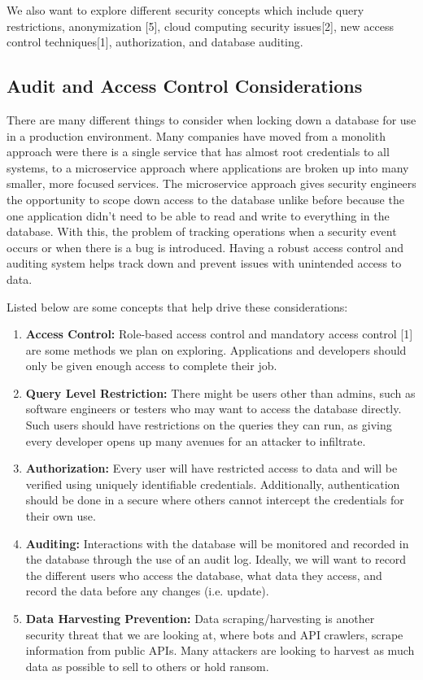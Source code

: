 \documentclass[sigconf]{acmart}
\begin{document}
We also want to explore different security concepts which include query restrictions, anonymization [5], cloud computing security issues[2], new access control techniques[1], authorization, and database auditing. 

\subsection{Audit and Access Control Considerations}

There are many different things to consider when locking down a database for use in a production environment. Many companies have moved from a monolith approach were there is a single service that has almost root credentials to all systems, to a microservice approach where applications are broken up into many smaller, more focused services. The microservice approach gives security engineers the opportunity to scope down access to the database unlike before because the one application didn't need to be able to read and write to everything in the database. With this, the problem of tracking operations when a security event occurs or when there is a bug is introduced. Having a robust access control and auditing system helps track down and prevent issues with unintended access to data.

Listed below are some concepts that help drive these considerations:
\begin{enumerate}
    \item \textbf{Access Control:} Role-based access control and mandatory access control [1] are some methods we plan on exploring. Applications and developers should only be given enough access to complete their job.
    
    \item \textbf{Query Level Restriction:} There might be users other than admins, such as software engineers or testers who may want to access the database directly. Such users should have restrictions on the queries they can run, as giving every developer opens up many avenues for an attacker to infiltrate.
    
    \item \textbf{Authorization:} Every user will have restricted access to data and will be verified using uniquely identifiable credentials. Additionally, authentication should be done in a secure where others cannot intercept the credentials for their own use.

    \item \textbf{Auditing:} Interactions with the database will be monitored and recorded in the database through the use of an audit log. Ideally, we will want to record the different users who access the database, what data they access, and record the data before any changes (i.e. update). 

   \item \textbf{Data Harvesting Prevention:} Data scraping/harvesting is another security threat that we are looking at, where bots and API crawlers, scrape information from public APIs. Many attackers are looking to harvest as much data as possible to sell to others or hold ransom. 
    
\end{enumerate}
\end{document}
